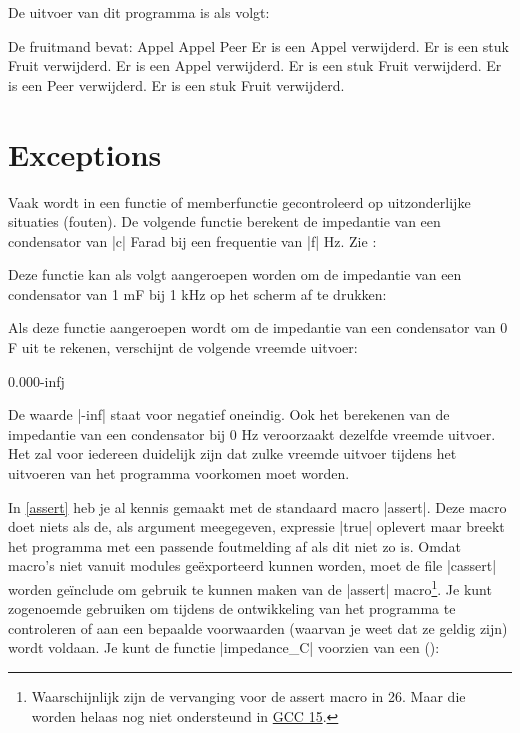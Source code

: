 \begin{cpplstShortInline}
De uitvoer van dit programma is als volgt:
\begin{coutput}
De fruitmand bevat:
  Appel
  Appel
  Peer
Er is een Appel verwijderd.
Er is een stuk Fruit verwijderd.
Er is een Appel verwijderd.
Er is een stuk Fruit verwijderd.
Er is een Peer verwijderd.
Er is een stuk Fruit verwijderd.
\end{coutput}

\chapter{Exceptions}
\label{exceptions}
Vaak wordt in een functie of memberfunctie gecontroleerd op uitzonderlijke situaties (fouten).
De volgende functie berekent de impedantie van een condensator van |c| Farad bij een frequentie van |f|
Hz. Zie :

Deze functie kan als volgt aangeroepen worden om de impedantie van een condensator van 1 mF bij
1 kHz op het scherm af te drukken:

Als deze functie aangeroepen wordt om de impedantie van een condensator van 0 F uit te rekenen, verschijnt de volgende vreemde uitvoer:
\begin{coutput}
0.000-infj
\end{coutput}

De waarde |-inf| staat voor negatief oneindig.
Ook het berekenen van de impedantie van een condensator bij 0 Hz veroorzaakt dezelfde vreemde uitvoer.
Het zal voor iedereen duidelijk zijn dat zulke vreemde uitvoer tijdens het uitvoeren van het programma voorkomen moet worden.

\label{sec:assert}
In \cref{assert} heb je al kennis gemaakt met de standaard macro |assert|.
Deze macro doet niets als de, als argument meegegeven, expressie |true| oplevert maar breekt het programma met een passende foutmelding af als dit niet zo is.
Omdat macro's niet vanuit modules geëxporteerd kunnen worden, moet de file |cassert| worden geïnclude om gebruik te kunnen maken van de |assert| macro\footnote{%
	Waarschijnlijk zijn  de vervanging voor de assert macro in \Cpp{}26.
	Maar die worden helaas nog niet ondersteund in \href{https://gcc.gnu.org/projects/cxx-status.html}{GCC 15}. 
}.
Je kunt zogenoemde \emph{} gebruiken om tijdens de ontwikkeling van het programma te controleren of aan een bepaalde voorwaarden (waarvan je  weet dat ze geldig zijn) wordt voldaan.
Je kunt de functie |impedance_C| voorzien van een  ():


\end{cpplstShortInline}
